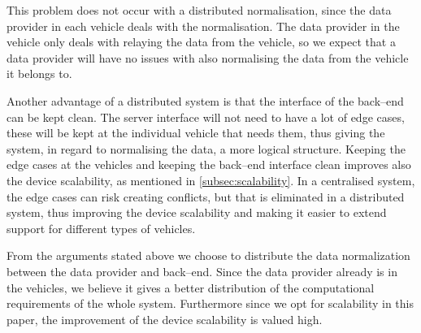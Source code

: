 This problem does not occur with a distributed normalisation, since the data provider in each vehicle deals with the normalisation.
The data provider in the vehicle only deals with relaying the data from the vehicle, 
so we expect that a data provider will have no issues with also normalising the data from the vehicle it belongs to.

Another advantage of a distributed system is that the interface of the back--end can be kept clean.
The server interface will not need to have a lot of edge cases, 
these will be kept at the individual vehicle that needs them, 
thus giving the system, in regard to normalising the data, a more logical structure.
Keeping the edge cases at the vehicles and keeping the back--end interface clean improves also the device scalability, 
as mentioned in \cref{subsec:scalability}.
In a centralised system, the edge cases can risk creating conflicts, but that is eliminated in a distributed system,
thus improving the device scalability and making it easier to extend support for different types of vehicles.

\bigskip

From the arguments stated above we choose to distribute the data normalization between the data provider and back--end.
Since the data provider already is in the vehicles, 
we believe it gives a better distribution of the computational requirements of the whole system.
Furthermore since we opt for scalability in this paper, the improvement of the device scalability is valued high.
